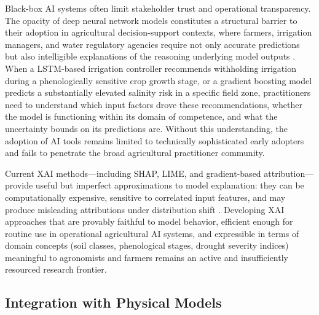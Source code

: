 \documentclass[land,review,accept,pdftex,oneauthor]{Definitions/mdpi}
\begin{document}
Black-box AI systems often limit stakeholder trust and operational transparency. The opacity of deep neural network models constitutes a structural barrier to their adoption in agricultural decision-support contexts, where farmers, irrigation managers, and water regulatory agencies require not only accurate predictions but also intelligible explanations of the reasoning underlying model outputs \citep{arrieta2020explainable}. When a LSTM-based irrigation controller recommends withholding irrigation during a phenologically sensitive crop growth stage, or a gradient boosting model predicts a substantially elevated salinity risk in a specific field zone, practitioners need to understand which input factors drove these recommendations, whether the model is functioning within its domain of competence, and what the uncertainty bounds on its predictions are. Without this understanding, the adoption of AI tools remains limited to technically sophisticated early adopters and fails to penetrate the broad agricultural practitioner community.

Current XAI methods---including SHAP, LIME, and gradient-based attribution---provide useful but imperfect approximations to model explanation: they can be computationally expensive, sensitive to correlated input features, and may produce misleading attributions under distribution shift \citep{adebayo2018sanity}. Developing XAI approaches that are provably faithful to model behavior, efficient enough for routine use in operational agricultural AI systems, and expressible in terms of domain concepts (soil classes, phenological stages, drought severity indices) meaningful to agronomists and farmers remains an active and insufficiently resourced research frontier.

\subsection{Integration with Physical Models}
\end{document}
